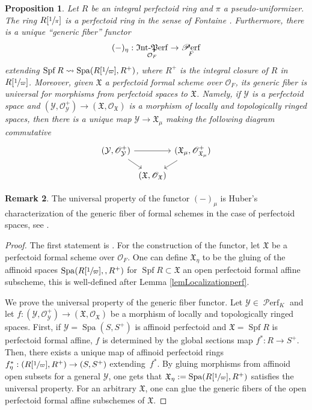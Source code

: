 \documentclass[JEP,XML,SOM,Unicode,published]{cedram}
\numberwithin{equation}{section}
\newtheorem{prop}{Proposition}[section]
\theoremstyle{definition}
\newtheorem{remark}[prop]{Remark}
\newcommand{\n}[1]{\mathcal{#1}}
\newcommand{\f}[1]{\mathfrak{#1}}
\newcommand{\s}[1]{\mathscr{#1}}
\DeclareMathOperator{\Spf}{Spf}
\DeclareMathOperator{\Spa}{Spa}
\DeclareMathOperator{\Intperf}{\f{I}nt\textup{-}\f{P}erf}
\DeclareMathOperator{\Perf}{\s{P}erf}
\begin{document}
\begin{prop}
\label{PropgenericFiberFunctor}
Let $R$ be an integral perfectoid ring and $\pi$ a pseudo-uniformizer. The ring $R[\sfrac{1}{\pi}]$ is a perfectoid ring in the sense of Fontaine \cite{MR3087355}. Furthermore, there is a unique ``generic fiber'' functor
\[
(-)_{\eta}: \Intperf_{\n{O}_F} \to \Perf_F
\]
extending $\Spf R \leadsto \Spa(R[\sfrac{1}{\varpi}], R^+)$, where $R^+$ is the integral closure of $R$ in $R[\sfrac{1}{\varpi}]$. Moreover, given $\f{X}$ a perfectoid formal scheme over $\n{O}_F$, its generic fiber is universal for morphisms from perfectoid spaces to $\f{X}$. Namely, if $\n{Y}$ is a perfectoid space and $(\n{Y}, \s{O}^+_{\n{Y}})\to (\f{X}, \s{O}_{\f{X}})$ is a morphism of locally and topologically ringed spaces, then there is a unique map $\n{Y}\to \f{X}_{\mu}$ making the following diagram commutative
\[
\begin{tikzcd}[row sep= 10pt, column sep =1pt]
(\n{Y}, \s{O}_{\n{Y}}^+)	\ar[rr]\ar[rd] & & (\f{X}_{\mu}, \s{O}_{\f{X}_{\mu}}^+)\ar[ld] \\
& (\f{X}, \s{O}_{\f{X}}) &
\end{tikzcd}
\]
\end{prop}

\begin{remark}
The universal property of the functor $(-)_{\mu}$ is Huber's characterization of the generic fiber of formal schemes in the case of perfectoid spaces, see \cite[Prop.\,4.1]{MR1306024}.
\end{remark}

\begin{proof}
The first statement is \cite[Lem.\,3.21]{MR3905467}. For the construction of the functor, let $\f{X}$ be a perfectoid formal scheme over $\n{O}_F$. One can define $\f{X}_{\eta}$ to be the gluing of the affinoid spaces $\Spa(R[\sfrac{1}{\varpi}],, R^+)$ for $\Spf R\subset \f{X}$ an open perfectoid formal affine subscheme, this is well-defined after Lemma \ref{lemLocalizationperf}.

We prove the universal property of the generic fiber functor. Let $\n{Y}\in \Perf_K$ and let $f:(\n{Y}, \s{O}^+_{\n{Y}})\to (\f{X}, \s{O}_{\f{X}})$ be a morphism of locally and topologically ringed spaces. First, if $\n{Y}=\Spa(S,S^+)$ is affinoid perfectoid and $\f{X}=\Spf R$ is perfectoid formal affine, $f$ is determined by the global sections map $f^*: R\to S^+$. Then, there exists a unique map of affinoid perfectoid rings $f^*_{\eta}: (R[\sfrac{1}{\varpi}], R^+)\to (S,S^+)$ extending~$f^*$. By gluing morphisms from affinoid open subsets for a general $\n{Y}$, one gets that $\f{X}_\eta:= \Spa(R[\sfrac{1}{\varpi}], R^+)$ satisfies the universal property. For an arbitrary $\f{X}$, one can glue the generic fibers of the open perfectoid formal affine subschemes of $\f{X}$.
\end{proof}
\end{document}
